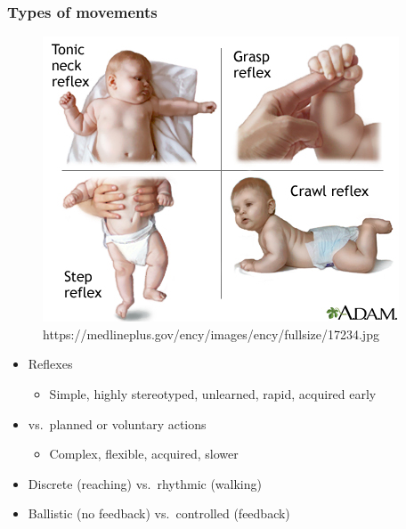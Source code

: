 \documentclass[
  letterpaper,
  DIV=11,
  numbers=noendperiod]{scrartcl}
\providecommand{\tightlist}{%
  \setlength{\itemsep}{0pt}\setlength{\parskip}{0pt}}\usepackage{longtable,booktabs,array}
\begin{document}
\subsubsection{Types of movements}\label{types-of-movements}

\begin{figure}[H]

{\centering \includegraphics{action_files/mediabag/17234.jpg}

}

\caption{https://medlineplus.gov/ency/images/ency/fullsize/17234.jpg}

\end{figure}%

\begin{itemize}
\tightlist
\item
  Reflexes

  \begin{itemize}
  \tightlist
  \item
    Simple, highly stereotyped, unlearned, rapid, acquired early
  \end{itemize}
\end{itemize}

\begin{itemize}
\tightlist
\item
  vs.~planned or voluntary actions

  \begin{itemize}
  \tightlist
  \item
    Complex, flexible, acquired, slower
  \end{itemize}
\item
  Discrete (reaching) vs.~rhythmic (walking)
\item
  Ballistic (no feedback) vs.~controlled (feedback)
\end{itemize}
\end{document}
